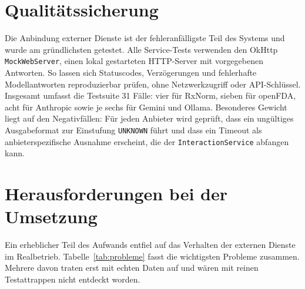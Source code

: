 \section{Qualitätssicherung}

Die Anbindung externer Dienste ist der fehleranfälligste Teil des Systems und wurde am gründlichsten getestet. Alle Service-Tests verwenden den OkHttp \texttt{MockWebServer}, einen lokal gestarteten HTTP-Server mit vorgegebenen Antworten. So lassen sich Statuscodes, Verzögerungen und fehlerhafte Modellantworten reproduzierbar prüfen, ohne Netzwerkzugriff oder API-Schlüssel. Insgesamt umfasst die Testsuite 31 Fälle: vier für RxNorm, sieben für openFDA, acht für Anthropic sowie je sechs für Gemini und Ollama. Besonderes Gewicht liegt auf den Negativfällen: Für jeden Anbieter wird geprüft, dass ein ungültiges Ausgabeformat zur Einstufung \texttt{UNKNOWN} führt und dass ein Timeout als anbieterspezifische Ausnahme erscheint, die der \texttt{InteractionService} abfangen kann.

\section{Herausforderungen bei der Umsetzung}
\label{sec:herausforderungen}

Ein erheblicher Teil des Aufwands entfiel auf das Verhalten der externen Dienste im Realbetrieb. Tabelle~\ref{tab:probleme} fasst die wichtigsten Probleme zusammen. Mehrere davon traten erst mit echten Daten auf und wären mit reinen Testattrappen nicht entdeckt worden.

